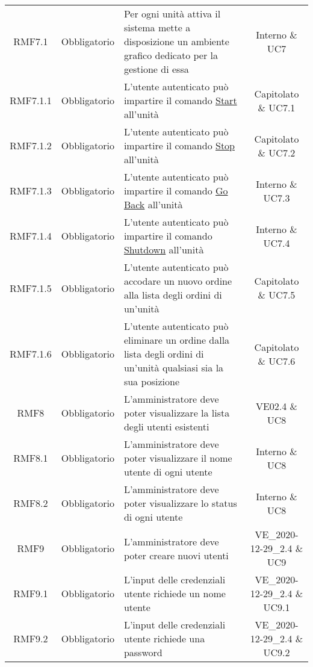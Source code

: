 \begin{longtable}[h!] { c c m{8cm} c}
		RMF7.1 & Obbligatorio & Per ogni unità attiva il sistema mette a disposizione un ambiente grafico dedicato per la gestione di essa & Interno \& UC7 \\

		RMF7.1.1 & Obbligatorio & L'utente autenticato può impartire il comando \underline{Start} all'unità & Capitolato \& UC7.1 \\

		RMF7.1.2 & Obbligatorio & L'utente autenticato può impartire il comando \underline{Stop} all'unità & Capitolato \& UC7.2 \\

		RMF7.1.3 & Obbligatorio & L'utente autenticato può impartire il comando \underline{Go Back} all'unità & Interno \& UC7.3 \\

		RMF7.1.4 & Obbligatorio & L'utente autenticato può impartire il comando \underline{Shutdown} all'unità & Interno \& UC7.4 \\

		RMF7.1.5 & Obbligatorio & L'utente autenticato può accodare un nuovo ordine alla lista degli ordini di un'unità & Capitolato \& UC7.5 \\

		RMF7.1.6 & Obbligatorio & L'utente autenticato può eliminare un ordine dalla lista degli ordini di un'unità qualsiasi sia la sua posizione & Capitolato \& UC7.6 \\

		RMF8 & Obbligatorio & L'amministratore deve poter visualizzare la lista degli utenti esistenti & VE02.4 \& UC8 \\

		RMF8.1 & Obbligatorio & L'amministratore deve poter visualizzare il nome utente di ogni utente & Interno \& UC8 \\

		RMF8.2 & Obbligatorio & L'amministratore deve poter visualizzare lo status di ogni utente & Interno \& UC8 \\

		RMF9 & Obbligatorio & L'amministratore deve poter creare nuovi utenti & VE\_2020-12-29\_2.4 \& UC9 \\

		RMF9.1 & Obbligatorio & L'input delle credenziali utente richiede un nome utente & VE\_2020-12-29\_2.4 \& UC9.1 \\

		RMF9.2 & Obbligatorio & L'input delle credenziali utente richiede una password & VE\_2020-12-29\_2.4 \& UC9.2 \\


\end{longtable}
